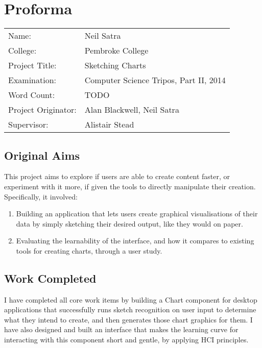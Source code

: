 \setcounter{page}{1}
\chapter*{Proforma}

\begin{tabular}{ll}
Name:               & Neil Satra					\\
College:            & Pembroke College				\\
Project Title:      & Sketching Charts				\\
Examination:        & Computer Science Tripos, Part II, 2014        \\
Word Count:         & TODO							\\
Project Originator: & Alan Blackwell, Neil Satra        \\
Supervisor:         & Alistair Stead				\\ 
\end{tabular}

\section*{Original Aims}
This project aims to explore if users are able to create content faster, or experiment with it more, if given the tools to directly manipulate their creation. Specifically, it involved:
\begin{enumerate}

	\item Building an application that lets users create graphical visualisations of their data by simply sketching their desired output, like they would on paper.

	\item Evaluating the learnability of the interface, and how it compares to existing tools for creating charts, through a user study.

\end{enumerate}

\section*{Work Completed}
I have completed all core work items by building a Chart component for desktop applications that successfully runs sketch recognition on user input to determine what they intend to create, and then generates those chart graphics for them. I have also designed and built an interface that makes the learning curve for interacting with this component short and gentle, by applying HCI principles. 

